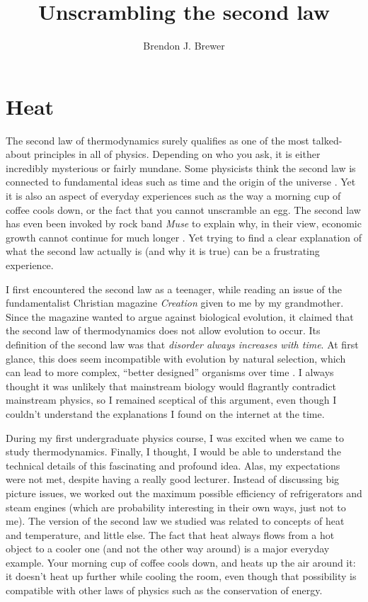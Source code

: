 \documentclass[a4paper, 12pt]{article}
\title{Unscrambling the second law}
\author{Brendon J. Brewer}
\begin{document}
\sffamily
\maketitle

\section*{Heat}

The second law of thermodynamics surely qualifies as one of the most
talked-about principles in all of physics. Depending on who you ask, it is
either incredibly mysterious or fairly mundane. Some physicists think
the second law is connected to
fundamental ideas such as time and the origin of the universe
\citep{carroll}. Yet it is also an aspect of everyday experiences
such as the way a morning cup of coffee cools down,
or the fact that you cannot unscramble an egg.
The second law has even been invoked by rock band {\em Muse} to
explain why, in their
view, economic growth cannot continue for much longer \citep{muse}.
Yet trying to find a clear explanation of what the second law actually is
(and why it is true) can be a frustrating experience.

I first encountered the second law
as a teenager, while reading an issue of the fundamentalist Christian magazine
{\em Creation} given to me by my grandmother. Since the magazine wanted to
argue against biological evolution, it claimed that the second law of
thermodynamics does not allow evolution to occur. Its definition of the second
law was that {\em disorder always increases with time}.
At first glance, this does seem incompatible with evolution by
natural selection, which can lead to more complex,
``better designed'' organisms over time \citep{dawkins}.
I always thought it was unlikely that mainstream biology would flagrantly
contradict mainstream physics, so I remained sceptical of this argument,
even though I couldn't understand the explanations I found on the
internet at the time.

During my first undergraduate physics course, I was excited when we came to
study thermodynamics. Finally, I thought, I would be able to understand the
technical details of this fascinating and profound idea.
Alas, my expectations were not met, despite having a really good lecturer.
Instead of discussing big picture issues, we
worked out the maximum possible efficiency of refrigerators and steam engines
(which are probability interesting in their own ways, just not to me).
The version of the second law we studied was related to concepts of heat
and temperature, and little else.
The fact that heat always flows from a hot object to a cooler
one (and not the other way around) is a major everyday example. Your morning
cup of coffee cools down, and heats up the air around it: it doesn't heat
up further while cooling the room, even though that possibility is compatible
with other laws of physics such as the conservation of energy.
\end{document}
